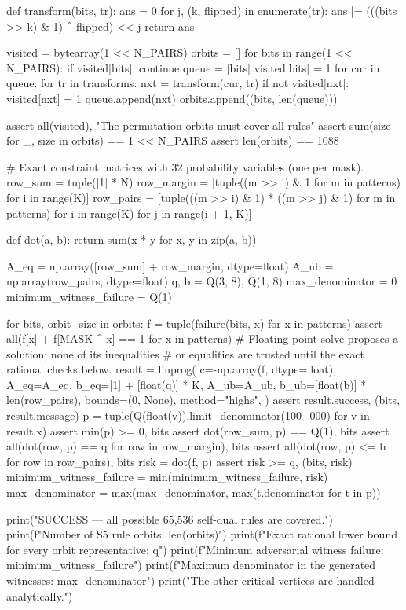 \documentclass[11pt,a4paper]{ctexart}
\theoremstyle{definition}
\begin{document}
\begin{CodeListing}
def transform(bits, tr):
    ans = 0
    for j, (k, flipped) in enumerate(tr):
        ans |= (((bits >> k) & 1) ^ flipped) << j
    return ans

visited = bytearray(1 << N_PAIRS)
orbits = []
for bits in range(1 << N_PAIRS):
    if visited[bits]:
        continue
    queue = [bits]
    visited[bits] = 1
    for cur in queue:
        for tr in transforms:
            nxt = transform(cur, tr)
            if not visited[nxt]:
                visited[nxt] = 1
                queue.append(nxt)
    orbits.append((bits, len(queue)))

assert all(visited), "The permutation orbits must cover all rules"
assert sum(size for _, size in orbits) == 1 << N_PAIRS
assert len(orbits) == 1088

# Exact constraint matrices with 32 probability variables (one per mask).
row_sum = tuple([1] * N)
row_margin = [tuple((m >> i) & 1 for m in patterns) for i in range(K)]
row_pairs = [tuple(((m >> i) & 1) * ((m >> j) & 1) for m in patterns)
             for i in range(K) for j in range(i + 1, K)]

def dot(a, b):
    return sum(x * y for x, y in zip(a, b))

A_eq = np.array([row_sum] + row_margin, dtype=float)
A_ub = np.array(row_pairs, dtype=float)
q, b = Q(3, 8), Q(1, 8)
max_denominator = 0
minimum_witness_failure = Q(1)

for bits, orbit_size in orbits:
    f = tuple(failure(bits, x) for x in patterns)
    assert all(f[x] + f[MASK ^ x] == 1 for x in patterns)
    # Floating point solve proposes a solution; none of its inequalities
    # or equalities are trusted until the exact rational checks below.
    result = linprog(
        c=-np.array(f, dtype=float),
        A_eq=A_eq, b_eq=[1] + [float(q)] * K,
        A_ub=A_ub, b_ub=[float(b)] * len(row_pairs),
        bounds=(0, None), method="highs",
    )
    assert result.success, (bits, result.message)
    p = tuple(Q(float(v)).limit_denominator(100_000) for v in result.x)
    assert min(p) >= 0, bits
    assert dot(row_sum, p) == Q(1), bits
    assert all(dot(row, p) == q for row in row_margin), bits
    assert all(dot(row, p) <= b for row in row_pairs), bits
    risk = dot(f, p)
    assert risk >= q, (bits, risk)
    minimum_witness_failure = min(minimum_witness_failure, risk)
    max_denominator = max(max_denominator, max(t.denominator for t in p))

print("SUCCESS — all possible 65,536 self-dual rules are covered.")
print(f"Number of S5 rule orbits: {len(orbits)}")
print(f"Exact rational lower bound for every orbit representative: {q}")
print(f"Minimum adversarial witness failure: {minimum_witness_failure}")
print(f"Maximum denominator in the generated witnesses: {max_denominator}")
print("The other critical vertices are handled analytically.")
\end{CodeListing}
\end{document}
